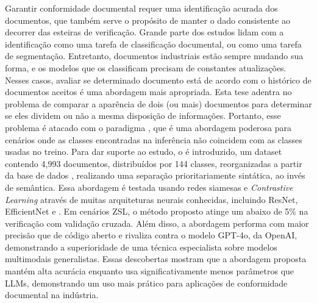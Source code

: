 Garantir conformidade documental requer uma identificação acurada dos documentos, que também serve o propósito de manter o dado consistente ao decorrer das esteiras de verificação. 
Grande parte dos estudos lidam com a identificação como uma tarefa de classificação documental, ou como uma tarefa de segmentação. Entretanto, documentos industriais estão sempre mudando sua forma, e os modelos que os classificam precisam de constantes atualizações. Nesses casos, avaliar se determinado documento está de acordo com o histórico de documentos aceitos é uma abordagem mais apropriada.
Esta tese adentra no problema de comparar a aparência de dois (ou mais) documentos para determinar se eles dividem ou não a mesma disposição de informações. Portanto, esse problema é atacado com o paradigma , que é uma abordagem poderosa para cenários onde as classes encontradas na inferência não coincidem com as classes usadas no treino. Para dar suporte ao estudo, o  é introduzido, um dataset contendo 4,993 documentos, distribuídos por 144 classes, reorganizadas a partir da base de dados , realizando uma separação prioritariamente sintática, ao invés de semântica. Essa abordagem é testada usando redes siamesas e \textit{Contrastive Learning} através de muitas arquiteturas neurais conhecidas, incluindo ResNet, EfficientNet e . Em cenários \acrshort{ZSL}, o método proposto atinge um  abaixo de 5\% na verificação com validação cruzada. Além disso, a abordagem  performa com maior precisão que  de código aberto e rivaliza contra o modelo GPT-4o, da OpenAI, demonstrando a superioridade de uma técnica especialista sobre modelos multimodais generalistas. Essas descobertas mostram que a abordagem proposta mantém alta acurácia enquanto usa significativamente menos parâmetros que \acrshort{LLM}s, demonstrando um uso mais prático para aplicações de conformidade documental na indústria.

